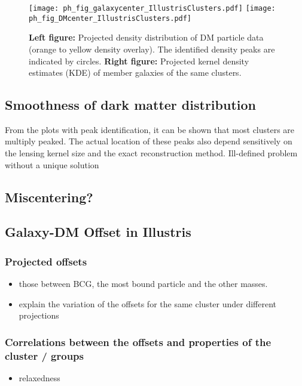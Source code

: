\begin{figure*} 
	\centering
	\texttt{[image: ph\_fig\_galaxycenter\_IllustrisClusters.pdf]}
	\texttt{[image: ph\_fig\_DMcenter\_IllustrisClusters.pdf]}
	\caption{ {\bf Left figure:} Projected density distribution of DM	
		particle data (orange to yellow density overlay). 
		The identified density peaks are indicated by circles. 
		{\bf Right figure:} Projected kernel density estimates (KDE) of member
		galaxies of the same clusters. 
		\label{fig:select_peak_visualization}
	}
\end{figure*}

\subsection{Smoothness of dark matter distribution}
From the plots with peak identification, it can be shown that most clusters are
multiply peaked. The actual location of these peaks also depend sensitively 
on the lensing kernel size and the exact reconstruction method.  
Ill-defined problem without a unique solution 

\subsection{Miscentering?}


\subsection{Galaxy-DM Offset in Illustris}
\subsubsection{Projected offsets}
\begin{itemize}
\item those between BCG, the most bound particle and the other masses. 
\item explain the variation of the offsets for the same cluster under different 
projections 
\end{itemize}


\subsubsection{Correlations between the offsets and properties of the cluster / groups}
\begin{itemize}
\item relaxedness
\end{itemize}


